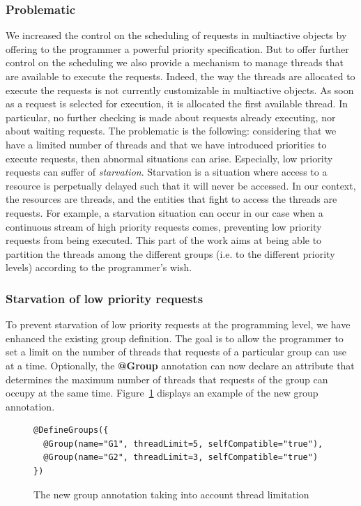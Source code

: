 \documentclass[11pt]{report}
\begin{document}
\subsubsection{Problematic}
We increased the control on the scheduling of requests in multiactive objects by offering to the programmer a powerful priority specification. But to offer further control on the scheduling we also provide a mechanism to manage threads that are available to execute the requests. Indeed, the way the threads are allocated to execute the requests is not currently customizable in multiactive objects. As soon as a request is selected for execution, it is allocated the first available thread. In particular, no further checking is made about requests already executing, nor about waiting requests. The problematic is the following: considering that we have a limited number of threads and that we have introduced priorities to execute requests, then abnormal situations can arise. Especially, low priority requests can suffer of \emph{starvation}. Starvation is a situation where access to a resource is perpetually delayed such that it will never be accessed. In our context, the resources are threads, and the entities that fight to access the threads are requests. For example, a starvation situation can occur in our case when a continuous stream of high priority requests comes, preventing low priority requests from being executed. 
This part of the work aims at being able to partition the threads among the different groups (i.e. to the different priority levels) according to the programmer's wish. 

\subsubsection{Starvation of low priority requests}
To prevent starvation of low priority requests at the programming level, we have enhanced the existing group definition. The goal is to allow the programmer to set a limit on the number of threads that requests of a particular group can use at a time. Optionally, the \textbf{@Group} annotation can now declare an attribute that determines the maximum number of threads that requests of the group can occupy at the same time. Figure~\ref{fig:new_groups} displays an example of the new group annotation.

\begin{figure}[!ht]
	\lstset{language=java, numbers=left, numberstyle=\tiny, stepnumber=1, numbersep=5pt, basicstyle=\footnotesize}
	\begin{lstlisting}[frame=single]
@DefineGroups({
  @Group(name="G1", threadLimit=5, selfCompatible="true"),
  @Group(name="G2", threadLimit=3, selfCompatible="true")
})
 	\end{lstlisting}
\caption{The new group annotation taking into account thread limitation}
\label{fig:new_groups}
\end{figure}
\end{document}
